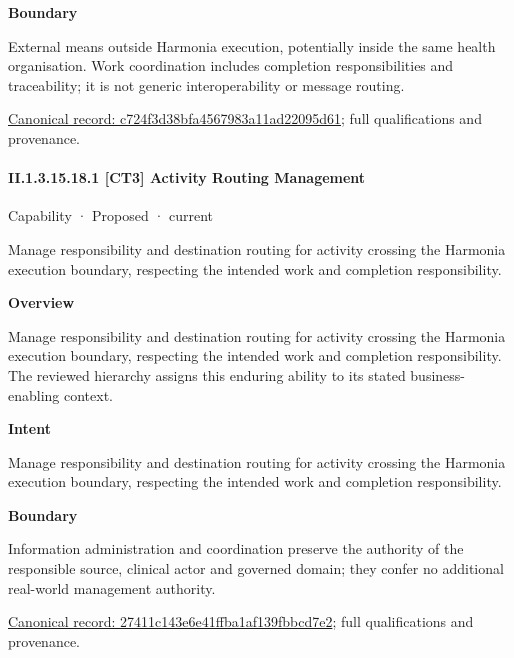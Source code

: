 \textbf{Boundary}



External means outside Harmonia execution, potentially inside the same health organisation. Work coordination includes completion responsibilities and traceability; it is not generic interoperability or message routing.


{\footnotesize \href{../../../../continuum/strategy/capability/c724f3d38bfa4567983a11ad22095d61.md}{Canonical record: c724f3d38bfa4567983a11ad22095d61}; full qualifications and provenance.}\par
\paragraph*{II.1.3.15.18.1 [CT3] Activity Routing Management}
\label{navigation:II.1.3.15.18.1}

\label{element:27411c143e6e41ffba1af139fbbcd7e2}
{\small Capability · Proposed · current}\par

Manage responsibility and destination routing for activity crossing the Harmonia execution boundary, respecting the intended work and completion responsibility.



\textbf{Overview}



Manage responsibility and destination routing for activity crossing the Harmonia execution boundary, respecting the intended work and completion responsibility. The reviewed hierarchy assigns this enduring ability to its stated business-enabling context.



\textbf{Intent}



Manage responsibility and destination routing for activity crossing the Harmonia execution boundary, respecting the intended work and completion responsibility.



\textbf{Boundary}



Information administration and coordination preserve the authority of the responsible source, clinical actor and governed domain; they confer no additional real-world management authority.


{\footnotesize \href{../../../../continuum/strategy/capability/27411c143e6e41ffba1af139fbbcd7e2.md}{Canonical record: 27411c143e6e41ffba1af139fbbcd7e2}; full qualifications and provenance.}\par
